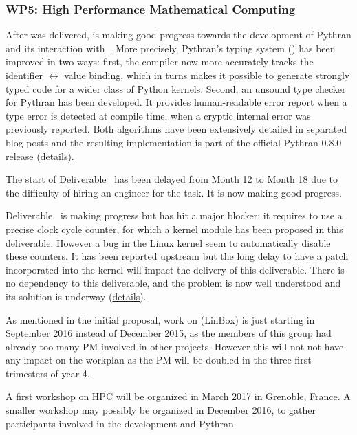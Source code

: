 \documentclass{deliverablereport}
\begin{document}
\subsubsection{WP5: High Performance Mathematical Computing}

After  was delivered,
 is making good progress towards the
development of Pythran and its interaction with~\Sage.
%
More precisely, Pythran's typing system () has
been improved in two ways: first, the compiler now more accurately tracks the
identifier $\leftrightarrow$ value binding, which in turns makes it possible to
generate strongly typed code for a wider class of Python kernels.  Second, an
unsound type checker for Pythran has been developed. It provides human-readable
error report when a type error is detected at compile time, when a cryptic
internal error was previously reported. Both algorithms have been extensively
detailed in separated blog posts and the resulting implementation is part of
the official Pythran 0.8.0 release
(\href{https://github.com/OpenDreamKit/OpenDreamKit/issues/117}{details}).

The start of Deliverable~ has been delayed from
Month 12 to Month 18 due to the difficulty of hiring an engineer for the task.
It is now making good progress.

Deliverable~ is making
progress but has hit a major blocker: it requires to use a precise
clock cycle counter, for which a kernel module has been proposed in
this deliverable. However a bug in the Linux kernel seem to
automatically disable these counters. It has been reported upstream
but the long delay to have a patch incorporated into the kernel will
impact the delivery of this deliverable. There is no dependency to
this deliverable, and the problem is now well understood and its
solution is underway
(\href{https://github.com/OpenDreamKit/OpenDreamKit/issues/118}{details}).

As mentioned in the initial proposal, work on
 (LinBox) is just starting in September 2016 instead
of December 2015, as the members of this group had already too many PM involved in other
projects. However this will not not have any impact on the workplan as the PM will be doubled
in the three first trimesters of year 4.

A first workshop on HPC will be organized in March 2017 in Grenoble,
France. A smaller workshop may possibly be organized in December 2016,
to gather participants involved in the development and Pythran.
\end{document}
